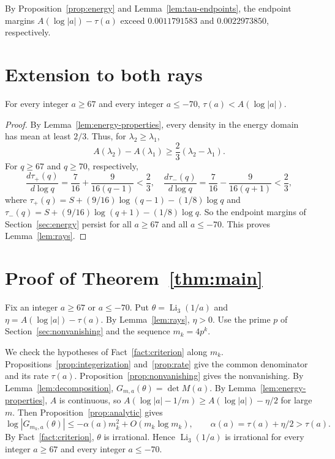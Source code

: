 By Proposition~\ref{prop:energy} and Lemma~\ref{lem:tau-endpoints}, the endpoint margins \(A(\log|a|)-\tau(a)\) exceed \(0.0011791583\) and \(0.0022973850\), respectively.

\section{Extension to both rays}\label{sec:rays}

\begin{lemma}\label{lem:rays}
For every integer \(a\ge67\) and every integer \(a\le-70\), \(\tau(a)<A(\log|a|)\).
\end{lemma}

\begin{proof}
By Lemma~\ref{lem:energy-properties}, every density in the energy domain has mean at least \(2/3\). Thus, for \(\lambda_2\ge\lambda_1\),
\[
 A(\lambda_2)-A(\lambda_1)\ge\frac23(\lambda_2-\lambda_1).
\]
For \(q\ge67\) and \(q\ge70\), respectively,
\[
 \frac{d\tau_+(q)}{d\log q}=\frac7{16}+\frac9{16(q-1)}<\frac23,
\quad
 \frac{d\tau_-(q)}{d\log q}=\frac7{16}-\frac9{16(q+1)}<\frac23,
\]
where \(\tau_+(q)=S+(9/16)\log(q-1)-(1/8)\log q\) and \(\tau_-(q)=S+(9/16)\log(q+1)-(1/8)\log q\). So the endpoint margins of Section~\ref{sec:energy} persist for all \(a\ge67\) and all \(a\le-70\). This proves Lemma~\ref{lem:rays}.
\end{proof}

\section{Proof of Theorem~\ref{thm:main}}\label{sec:proof}

Fix an integer \(a\ge67\) or \(a\le-70\). Put \(\theta=\operatorname{Li}_3(1/a)\) and \(\eta=A(\log|a|)-\tau(a)\). By Lemma~\ref{lem:rays}, \(\eta>0\). Use the prime \(p\) of Section~\ref{sec:nonvanishing} and the sequence \(m_k=4p^k\).

We check the hypotheses of Fact~\ref{fact:criterion} along \(m_k\). Propositions~\ref{prop:integerization} and~\ref{prop:rate} give the common denominator and its rate \(\tau(a)\). Proposition~\ref{prop:nonvanishing} gives the nonvanishing. By Lemma~\ref{lem:decomposition}, \(G_{m,a}(\theta)=\det M(a)\). By Lemma~\ref{lem:energy-properties}, \(A\) is continuous, so \(A(\log|a|-1/m)\ge A(\log|a|)-\eta/2\) for large \(m\). Then Proposition~\ref{prop:analytic} gives
\[
 \log|G_{m_k,a}(\theta)|\le-\alpha(a)m_k^2+O(m_k\log m_k),\qquad
 \alpha(a)=\tau(a)+\eta/2>\tau(a).
\]
By Fact~\ref{fact:criterion}, \(\theta\) is irrational. Hence \(\operatorname{Li}_3(1/a)\) is irrational for every integer \(a\ge67\) and every integer \(a\le-70\).
